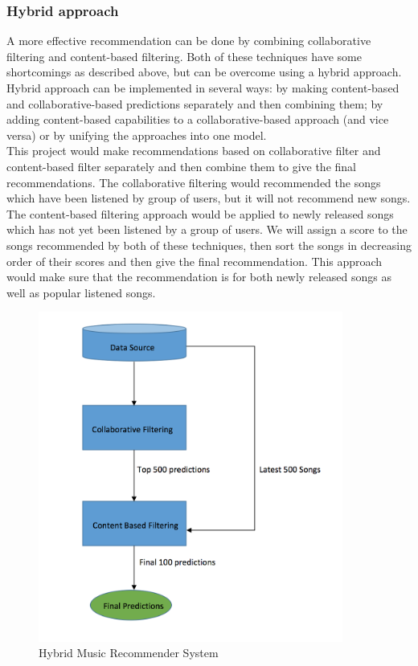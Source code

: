 \documentclass{sig-alternate-05-2015}
\begin{document}
\subsubsection{Hybrid approach}

A more effective recommendation can be done by combining collaborative filtering and content-based filtering. Both of these techniques have some shortcomings as described above, but can be overcome using a hybrid approach. Hybrid approach can be implemented in several ways: by making content-based and collaborative-based predictions separately and then combining them; by adding content-based capabilities to a collaborative-based approach (and vice versa) or by unifying the approaches into one model.\\

This project would make recommendations based on collaborative filter and content-based filter separately and then combine them to give the final recommendations. The collaborative filtering would recommended the songs which have been listened by group of users, but it will not recommend new songs. The content-based filtering approach would be applied to newly released songs which has not yet been listened by a group of users. We will assign a score to the songs recommended by both of these techniques, then sort the songs in decreasing order of their scores and then give the final recommendation. This approach would make sure that the recommendation is for both newly released songs as well as popular listened songs.\\

\begin{figure}[h]
    \centering
\includegraphics [width =10cm]{Images/HybridStructure.png}
    \caption{Hybrid Music Recommender System}
\end{figure}
\end{document}
